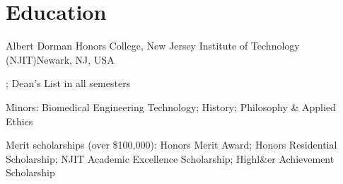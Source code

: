 \documentclass[a4paper,11pt]{article}  %
\begin{document}

\section{Education}
      {Albert Dorman Honors College, New Jersey Institute of Technology (NJIT)}{Newark, NJ, USA}
\begin{cvitems}
  \item \gpaUK; Dean's List in all semesters
  \item Minors: Biomedical Engineering Technology; History; Philosophy \& Applied Ethics
  \item Merit scholarships (over \$100,000): Honors Merit Award; Honors Residential Scholarship; NJIT Academic Excellence Scholarship; Highl\&er Achievement Scholarship
\end{cvitems}
\end{document}
